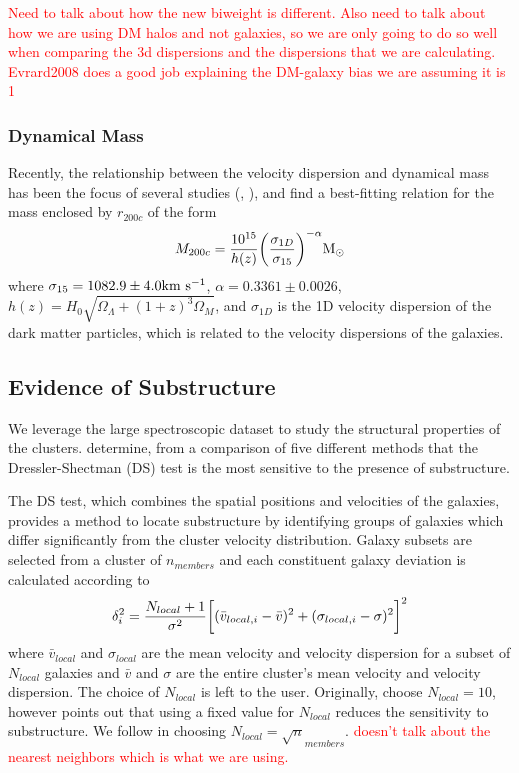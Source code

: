 \documentclass[apj, revtex4]{emulateapj}
\newcommand{\editorial}[1]{\textcolor{red}{#1} }
\begin{document}
\editorial{Need to talk about how the new biweight is different. Also need to talk about how we are using DM halos and not galaxies, so we are only going to do so well when comparing the 3d dispersions and the dispersions that we are calculating. Evrard2008 does a good job explaining the DM-galaxy bias we are assuming it is 1}

\subsubsection{Dynamical Mass}
Recently, the relationship between the velocity dispersion and dynamical mass has been the focus of several studies (\eg, \citealt{Evrard2008, Saro2013, Sifon2013, VanderBurg2014}), and find a best-fitting relation for the mass enclosed by $r_{200c}$ of the form
\begin{equation}
	M_{200c} = \frac{10^{15}}{h(z)} \bigg{(}\frac{\sigma_{1D}}{\sigma_{15}} \bigg{)}^{-\alpha} \hbox{$\mathrm{M}_\odot$}
\end{equation}
where $\sigma_{15} = 1082.9 \pm 4.0 \hbox{km~s$^{-1}$}$, $\alpha = 0.3361 \pm 0.0026$, $h(z) = H_0 \sqrt{\Omega_\Lambda + (1+z)^3\Omega_M}$, and $\sigma_{1D}$ is the 1D velocity dispersion of the dark matter particles, which is related to the velocity dispersions of the galaxies.

\subsection{Evidence of Substructure}
We leverage the large spectroscopic dataset to study the structural properties of the clusters. \cite{Pinkney1996} determine, from a comparison of five different methods that the Dressler-Shectman (DS) test \citep{Dressler1988} is the most sensitive to the presence of substructure.

The DS test, which combines the spatial positions and velocities of the galaxies, provides a method to locate substructure by identifying groups of galaxies which differ significantly from the cluster velocity distribution. Galaxy subsets are selected from a cluster of $n_{members}$ and each constituent galaxy deviation is calculated according to
\begin{equation}
	\delta_i^2 = \frac{N_{local}+1}{\sigma^2}\bigg{[}(\bar{v}_{local,i} - \bar{v})^2 + (\sigma_{local,i} - \sigma)^2\bigg{]}^2
\end{equation}
where $\bar{v}_{local}$ and $\sigma_{local}$ are the mean velocity and velocity dispersion for a subset of $N_{local}$ galaxies and $\bar{v}$ and $\sigma$ are the entire cluster's mean velocity and velocity dispersion. The choice of $N_{local}$ is left to the user. Originally, \cite{Dressler1988} choose $N_{local}=10$, however \cite{Bird1994} points out that using a fixed value for $N_{local}$ reduces the sensitivity to substructure. We follow \cite{Bird1994} in choosing $N_{local} = \sqrt n_{members}$. \editorial{doesn't talk about the nearest neighbors which is what we are using.}
\end{document}
